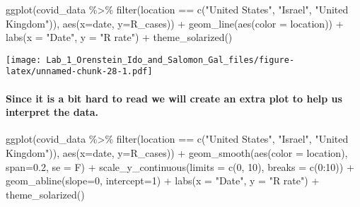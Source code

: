 \documentclass[
]{article}
\newenvironment{Shaded}{\begin{snugshade}}{\end{snugshade}}
\newcommand{\AttributeTok}[1]{\textcolor[rgb]{0.77,0.63,0.00}{#1}}
\newcommand{\DecValTok}[1]{\textcolor[rgb]{0.00,0.00,0.81}{#1}}
\newcommand{\FloatTok}[1]{\textcolor[rgb]{0.00,0.00,0.81}{#1}}
\newcommand{\FunctionTok}[1]{\textcolor[rgb]{0.00,0.00,0.00}{#1}}
\newcommand{\NormalTok}[1]{#1}
\newcommand{\SpecialCharTok}[1]{\textcolor[rgb]{0.00,0.00,0.00}{#1}}
\newcommand{\StringTok}[1]{\textcolor[rgb]{0.31,0.60,0.02}{#1}}
\begin{document}
\begin{Shaded}
\begin{Highlighting}[]
\FunctionTok{ggplot}\NormalTok{(covid\_data }\SpecialCharTok{\%\textgreater{}\%} \FunctionTok{filter}\NormalTok{(location }\SpecialCharTok{==} \FunctionTok{c}\NormalTok{(}\StringTok{"United States"}\NormalTok{, }\StringTok{"Israel"}\NormalTok{, }\StringTok{"United Kingdom"}\NormalTok{)), }\FunctionTok{aes}\NormalTok{(}\AttributeTok{x=}\NormalTok{date, }\AttributeTok{y=}\NormalTok{R\_cases)) }\SpecialCharTok{+}
  \FunctionTok{geom\_line}\NormalTok{(}\FunctionTok{aes}\NormalTok{(}\AttributeTok{color =}\NormalTok{ location)) }\SpecialCharTok{+}
  \FunctionTok{labs}\NormalTok{(}\AttributeTok{x =} \StringTok{"Date"}\NormalTok{, }\AttributeTok{y =} \StringTok{"R rate"}\NormalTok{) }\SpecialCharTok{+}
  \FunctionTok{theme\_solarized}\NormalTok{()}
\end{Highlighting}
\end{Shaded}

\texttt{[image: Lab\_1\_Orenstein\_Ido\_and\_Salomon\_Gal\_files/figure-latex/unnamed-chunk-28-1.pdf]}

\hypertarget{since-it-is-a-bit-hard-to-read-we-will-create-an-extra-plot-to-help-us-interpret-the-data.}{%
\paragraph{Since it is a bit hard to read we will create an extra plot
to help us interpret the
data.}\label{since-it-is-a-bit-hard-to-read-we-will-create-an-extra-plot-to-help-us-interpret-the-data.}}

\begin{Shaded}
\begin{Highlighting}[]
\FunctionTok{ggplot}\NormalTok{(covid\_data }\SpecialCharTok{\%\textgreater{}\%} \FunctionTok{filter}\NormalTok{(location }\SpecialCharTok{==} \FunctionTok{c}\NormalTok{(}\StringTok{"United States"}\NormalTok{, }\StringTok{"Israel"}\NormalTok{, }\StringTok{"United Kingdom"}\NormalTok{)), }\FunctionTok{aes}\NormalTok{(}\AttributeTok{x=}\NormalTok{date, }\AttributeTok{y=}\NormalTok{R\_cases)) }\SpecialCharTok{+}
  \FunctionTok{geom\_smooth}\NormalTok{(}\FunctionTok{aes}\NormalTok{(}\AttributeTok{color =}\NormalTok{ location), }\AttributeTok{span=}\FloatTok{0.2}\NormalTok{, }\AttributeTok{se =}\NormalTok{ F) }\SpecialCharTok{+}
  \FunctionTok{scale\_y\_continuous}\NormalTok{(}\AttributeTok{limits =} \FunctionTok{c}\NormalTok{(}\DecValTok{0}\NormalTok{, }\DecValTok{10}\NormalTok{), }\AttributeTok{breaks =} \FunctionTok{c}\NormalTok{(}\DecValTok{0}\SpecialCharTok{:}\DecValTok{10}\NormalTok{)) }\SpecialCharTok{+} 
  \FunctionTok{geom\_abline}\NormalTok{(}\AttributeTok{slope=}\DecValTok{0}\NormalTok{, }\AttributeTok{intercept=}\DecValTok{1}\NormalTok{) }\SpecialCharTok{+}
  \FunctionTok{labs}\NormalTok{(}\AttributeTok{x =} \StringTok{"Date"}\NormalTok{, }\AttributeTok{y =} \StringTok{"R rate"}\NormalTok{) }\SpecialCharTok{+}
  \FunctionTok{theme\_solarized}\NormalTok{()}
\end{Highlighting}
\end{Shaded}
\end{document}
